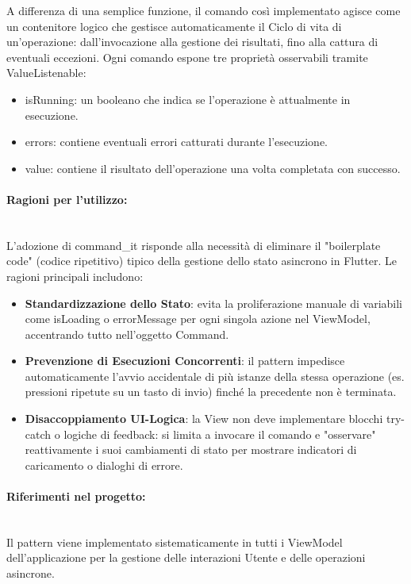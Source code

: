 \documentclass[a4paper,12pt]{article}
\newcommand{\code}[1]{{\ttfamily\textcolor{purple!85!black}{#1}}}
\begin{document}
A differenza di una semplice funzione, il comando così implementato agisce come un contenitore logico che gestisce automaticamente il Ciclo di vita di un'operazione: dall'invocazione alla gestione dei risultati, fino alla cattura di eventuali eccezioni. Ogni comando espone tre proprietà osservabili tramite \code{ValueListenable}:
\begin{itemize}
	\item \code{isRunning}: un booleano che indica se l'operazione è attualmente in esecuzione.
	\item \code{errors}: contiene eventuali errori catturati durante l'esecuzione.
	\item \code{value}: contiene il risultato dell'operazione una volta completata con successo.
\end{itemize}



\paragraph{Ragioni per l'utilizzo:}\mbox{}\\
L'adozione di \code{command\_it} risponde alla necessità di eliminare il "boilerplate code" (codice ripetitivo) tipico della gestione dello stato asincrono in Flutter. Le ragioni principali includono:
\begin{itemize}
	\item \textbf{Standardizzazione dello Stato}: evita la proliferazione manuale di variabili come \code{isLoading} o \code{errorMessage} per ogni singola azione nel ViewModel, accentrando tutto nell'oggetto Command.
	\item \textbf{Prevenzione di Esecuzioni Concorrenti}: il pattern impedisce automaticamente l'avvio accidentale di più istanze della stessa operazione (es. pressioni ripetute su un tasto di invio) finché la precedente non è terminata.
	\item \textbf{Disaccoppiamento UI-Logica}: la View non deve implementare blocchi \code{try-catch} o logiche di feedback: si limita a invocare il comando e "osservare" reattivamente i suoi cambiamenti di stato per mostrare indicatori di caricamento o dialoghi di errore.
\end{itemize}

\paragraph{Riferimenti nel progetto:}\mbox{}\\
Il pattern viene implementato sistematicamente in tutti i ViewModel dell'applicazione per la gestione delle interazioni Utente e delle operazioni asincrone.
\end{document}

